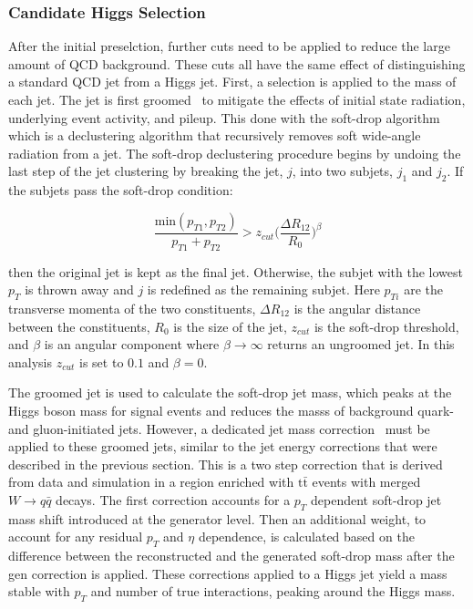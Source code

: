 \subsubsection{Candidate Higgs Selection}

After the initial preselction, further cuts need to be applied to reduce the large amount of QCD background. These cuts all have the same effect of distinguishing a standard QCD jet from a Higgs jet. First, a selection is applied to the mass of each jet. The jet is first groomed~\cite{JetGrooming} to mitigate the effects of initial state radiation, underlying event activity, and pileup. This done with the soft-drop algorithm~\cite{SDMass, SDMass2} which is a declustering algorithm that recursively removes soft wide-angle radiation from a jet. The soft-drop declustering procedure begins by undoing the last step of the jet clustering by breaking the jet, $j$, into two subjets, $j_{1}$ and $j_{2}$. If the subjets pass the soft-drop condition:

\begin{equation}
\frac{\mathrm{min}(p_{T1},p_{T2})}{p_{T1}+p_{T2}} > z_{cut}\bigg(\frac{\Delta R_{12}}{R_{0}}\bigg)^{\beta}
\end{equation}

\noindent
then the original jet is kept as the final jet. Otherwise, the subjet with the lowest $p_{T}$ is thrown away and $j$ is redefined as the remaining subjet. Here $p_{Ti}$ are the transverse momenta of the two constituents, $\Delta R_{12}$ is the angular distance between the constituents, $R_{0}$ is the size of the jet, $z_{cut}$ is the soft-drop threshold, and $\beta$ is an angular component where $\beta\rightarrow\infty$ returns an ungroomed jet. In this analysis $z_{cut}$ is set to $0.1$ and $\beta = 0$. 

The groomed jet is used to calculate the soft-drop jet mass, which peaks at the Higgs boson mass for signal events and reduces the masss of background quark- and gluon-initiated jets. However, a dedicated jet mass correction~\cite{SDCorr} must be applied to these groomed jets, similar to the jet energy corrections that were described in the previous section. This is a two step correction that is derived from data and simulation in a region enriched with $\mathrm{t\bar{t}}$ events with merged $W\rightarrow q\bar{q}$ decays. The first correction accounts for a $p_{T}$ dependent soft-drop jet mass shift introduced at the generator level. Then an additional weight, to account for any residual $p_{T}$ and $\eta$ dependence, is calculated based on the difference between the reconstructed and the generated soft-drop mass after the gen correction is applied. These corrections applied to a Higgs jet yield a mass stable with $p_{T}$ and number of true interactions, peaking around the Higgs mass.

